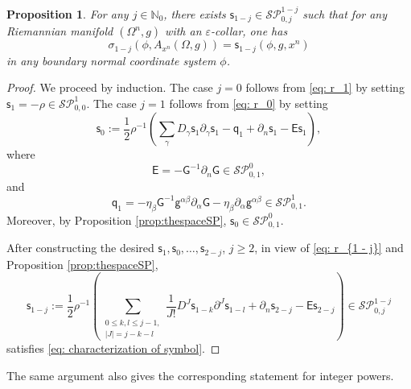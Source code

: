 \documentclass[11pt]{amsart}
\newtheorem{proposition}[theorem]{Proposition}
\theoremstyle{definition}
\numberwithin{equation}{section}
\begin{document}
\begin{proposition}\label{prop: characterization of symbol}
    For any $j\in\mathbb N_0$, there exists $\mathsf s_{1-j}\in\mathcal{SP}_{0,j}^{1-j}$ such that  for any Riemannian manifold $(\Omega^n,g)$ with an $\varepsilon$-collar,    one has
    \begin{equation}\label{eq: characterization of symbol}
        \sigma_{1-j}(\phi,A_{x^n}(\Omega,g)) = \mathsf s_{1-j}(\phi,g,x^n) 
    \end{equation}
    in any boundary normal coordinate system $\phi$.
\end{proposition}
\begin{proof}
    We proceed by induction. The   case $j=0$ follows from \eqref{eq: r_1} by setting $\mathsf s_1 =- \rho \in \mathcal {SP}_{0,0}^1$. 
    The   case $j=1$ follows from \eqref{eq: r_0} by setting 
    \[ \mathsf s_0 := \frac{1}{2}\rho^{-1}\left(\sum_\gamma D_\gamma\mathsf s_1\partial_\gamma\mathsf s_1 -\mathsf q_1 + \partial_n\mathsf s_1-\mathsf E\mathsf s_1\right),\]
    where 
    \[\mathsf E = - \mathsf G^{-1}\partial_n  \mathsf G\in\mathcal{SP}_{0,1}^0,\]
    and  
    \[\mathsf q_1 = -\eta_\beta \mathsf G^{-1}\mathsf g^{\alpha\beta}\partial_\alpha\mathsf G - \eta_\beta\partial_\alpha\mathsf g^{\alpha\beta}\in\mathcal {SP}_{0,1}^1.\] 
    Moreover,  
by Proposition \ref{prop:thespaceSP}, $\mathsf s_0  \in \mathcal{SP}_{0,1}^0$.


  After constructing the desired $\mathsf s_1,\mathsf s_0,\dots,\mathsf s_{2-j}$, $j\ge 2$,   in view of \eqref{eq: r_{1 - j}} and Proposition \ref{prop:thespaceSP}, 
    \[\mathsf s_{1-j} := \frac{1}{2}\rho ^{-1}\left(\sum_{\substack{0\le k,l\le j-1,\\ |J| = j-k-l}}\frac{1}{J!}D^J\mathsf s_{1-k} \partial^J\mathsf s_{1-l} + \partial_{n}\mathsf s_{2 - j} -\mathsf E\mathsf s_{2 - j}\right) \in \mathcal{SP}_{0,j}^{1-j} \]
     satisfies \eqref{eq: characterization of symbol}.
\end{proof}

The same argument also gives the corresponding statement for integer powers.
\end{document}
